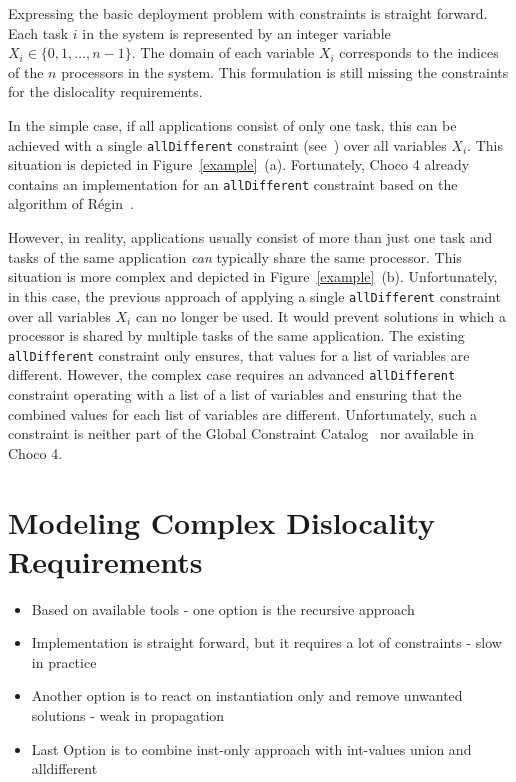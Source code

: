 \documentclass[english,biblatex]{lni}
\begin{document}
Expressing the basic deployment problem with constraints is straight forward.
Each task $i$ in the system is represented by an integer variable $X_i \in \{0, 1, \dots, n-1\}$. The domain of each variable $X_i$ corresponds to the indices of the $n$ processors in the system.
This formulation is still missing the constraints for the dislocality requirements.

In the simple case, if all applications consist of only one task, this can be achieved with a single \texttt{allDifferent} constraint (see~\cite{GCCAT2014}) over all variables $X_i$.
This situation is depicted in Figure~\ref{example}~(a).
Fortunately, Choco 4 already contains an implementation for an \texttt{allDifferent} constraint based on the algorithm of Régin~\cite{Regin1994}.

However, in reality, applications usually consist of more than just one task and tasks of the same application \emph{can} typically share the same processor.
This situation is more complex and depicted in Figure~\ref{example}~(b).
Unfortunately, in this case, the previous approach of applying a single \texttt{allDifferent} constraint over all variables $X_i$ can no longer be used.
It would prevent solutions in which a processor is shared by multiple tasks of the same application.
The existing \texttt{allDifferent} constraint only ensures, that values for a list of variables are different.
However, the complex case requires an advanced \texttt{allDifferent} constraint operating with a list of a list of variables and ensuring that the combined values for each list of variables are different.
Unfortunately, such a constraint is neither part of the Global Constraint Catalog~\cite{GCCAT2014} nor available in Choco 4.



\section{Modeling Complex Dislocality Requirements}

\begin{itemize}
\item Based on available tools - one option is the recursive approach
\item Implementation is straight forward, but it requires a lot of constraints - slow in practice
\item Another option is to react on instantiation only and remove unwanted solutions - weak in propagation
\item Last Option is to combine inst-only approach with int-values union and alldifferent
\end{itemize}
\end{document}
